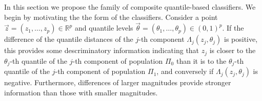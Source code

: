 
In this section we propose the family of composite quantile-based classifiers.
We begin by motivating the the form of the classifiers.  Consider a point
$\vec{z} = (z_1, \dots, z_p) \in \mathbb{R}^p$ and quantile levels
$\vec{\theta} = (\theta_1, \dots, \theta_p) \in (0, 1)^p$.  If the difference of
the quantile distances of the $j$-th component $\Lambda_j(z_j, \theta_j)$ is
positive, this provides some descriminatory information indicating that $z_j$ is
closer to the $\theta_j$-th quantile of the $j$-th component of population
$\Pi_0$ than it is to the $\theta_j$-th quantile of the $j$-th component of
population $\Pi_1$, and conversely if $\Lambda_j(z_j, \theta_j)$ is negative.
Furthermore, differences of larger magnitudes provide stronger information than
those with smaller magnitudes.

